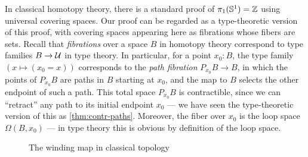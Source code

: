 %
In classical homotopy theory, there is a standard proof of $\pi_1(\mathbb{S}^1)=\mathbb{Z}$ using universal covering spaces.
Our proof can be regarded as a type-theoretic version of this proof, with covering spaces appearing here as fibrations whose fibers are sets.
%
%
Recall that \emph{fibrations} over a space $B$ in homotopy theory correspond to type families $B\to\mathcal{U}$ in type theory.
%
%
In particular, for a point $x_0:B$, the type family $(x\mapsto (x_0=x))$ corresponds to the \emph{path fibration} $P_{x_0} B \to B$, in which the points of $P_{x_0} B$ are paths in $B$ starting at $x_0$, and the map to $B$ selects the other endpoint of such a path.
This total space $P_{x_0} B$ is contractible, since we can ``retract'' any path to its initial endpoint $x_0$ --- we have seen the type-theoretic version of this as \autoref{thm:contr-paths}.
Moreover, the fiber over $x_0$ is the loop space $\Omega(B,x_0)$ --- in type theory this is obvious by definition of the loop space.

\begin{figure}\centering
  \caption{The winding map in classical topology}\label{fig:winding}
\end{figure}

